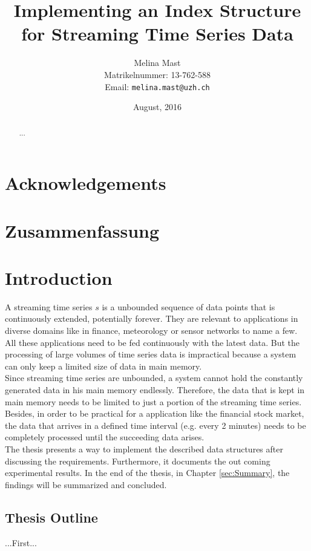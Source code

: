 \documentclass[abstracton,12pt]{scrreprt}
\title{Implementing an Index Structure for Streaming Time Series Data}
\author{
  Melina Mast\\[-5pt]
  \scriptsize Matrikelnummer: 13-762-588\\[-5pt]
  \scriptsize Email: \texttt{melina.mast@uzh.ch}
}
\date{\vspace*{2cm}August, 2016}
\begin{document}
\maketitle

\chapter*{Acknowledgements}



\begin{abstract}
  ...
\end{abstract}

\chapter*{Zusammenfassung}

\tableofcontents
\listoffigures
\listoftables
\listofalgorithms


\chapter{Introduction}
A streaming time series \(s\) is a unbounded sequence of data points that is continuously extended, potentially forever. They are relevant to applications in diverse domains like in finance, meteorology or sensor networks to name a few. All these applications need to be fed continuously with the latest data. But the processing of large volumes of time series data is impractical because a system can only keep a limited size of data in main memory.\\
Since streaming time series are unbounded, a system cannot hold the constantly generated data in his main memory endlessly. Therefore, the data that is kept in main memory needs to be limited to just a portion of the streaming time series. Besides, in order to be practical for a application like the financial stock market, the data that arrives in a defined time interval (e.g. every 2 minutes) needs to be completely processed until the succeeding data arises.\\
The thesis presents a way to implement the described data structures after discussing the requirements. Furthermore, it documents the out coming experimental results.
In the end of the thesis, in Chapter \ref{sec:Summary}, the findings will be summarized and concluded.

\section{Thesis Outline}
...First...
\end{document}
